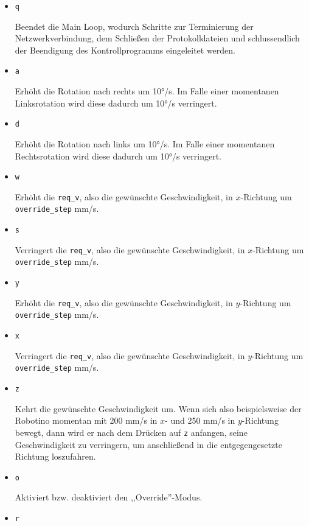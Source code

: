\begin{itemize}
	\item \verb|q|

		Beendet die Main Loop, wodurch Schritte zur Terminierung der
		Netzwerkverbindung, dem Schließen der Protokolldateien und schlussendlich
		der Beendigung des Kontrollprogramms eingeleitet werden.

	\item \verb|a|

		Erhöht die Rotation nach rechts um 10°/s. Im Falle einer momentanen
		Linksrotation wird diese dadurch um 10°/s verringert.

	\item \verb|d|

		Erhöht die Rotation nach links um 10°/s. Im Falle einer momentanen
		Rechtsrotation wird diese dadurch um 10°/s verringert.

	\item \verb|w|

		Erhöht die \verb|req_v|, also die gewünschte Geschwindigkeit, in
		$x$-Richtung um \verb|override_step| mm/s.

	\item \verb|s|

		Verringert die \verb|req_v|, also die gewünschte Geschwindigkeit, in
		$x$-Richtung um \verb|override_step| mm/s.

	\item \verb|y|

		Erhöht die \verb|req_v|, also die gewünschte Geschwindigkeit, in
		$y$-Richtung um \verb|override_step| mm/s.

	\item \verb|x|

		Verringert die \verb|req_v|, also die gewünschte Geschwindigkeit, in
		$y$-Richtung um \verb|override_step| mm/s.

	\item \verb|z|

		Kehrt die gewünschte Geschwindigkeit um. Wenn sich also beispielsweise
		der Robotino momentan mit 200 mm/s in $x$- und 250 mm/s in $y$-Richtung
		bewegt, dann wird er nach dem Drücken auf \verb|z| anfangen, seine
		Geschwindigkeit zu verringern, um anschließend in die entgegengesetzte
		Richtung loszufahren.

	\item \verb|o|

		Aktiviert bzw. deaktiviert den ,,Override''-Modus.

	\item \verb|r|


\end{itemize}

